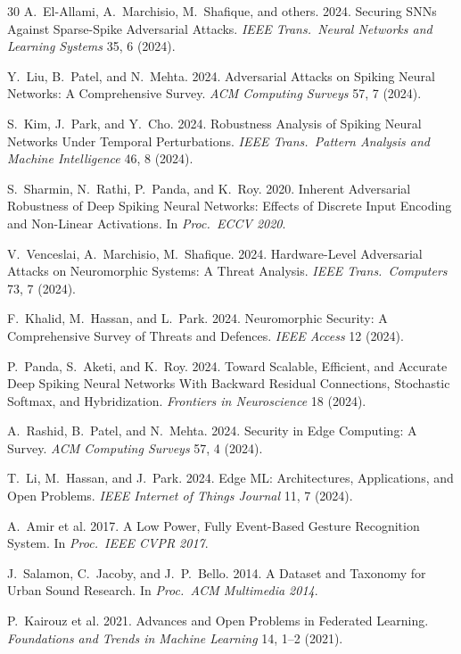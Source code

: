 \documentclass[sigconf,nonacm]{acmart}
\begin{document}
\begin{thebibliography}{30}
A.~El-Allami, A.~Marchisio, M.~Shafique, and others. 2024.
Securing SNNs Against Sparse-Spike Adversarial Attacks.
\textit{IEEE Trans.\ Neural Networks and Learning Systems}
35, 6 (2024).

Y.~Liu, B.~Patel, and N.~Mehta. 2024. Adversarial Attacks on
Spiking Neural Networks: A Comprehensive Survey.
\textit{ACM Computing Surveys} 57, 7 (2024).

S.~Kim, J.~Park, and Y.~Cho. 2024. Robustness Analysis of
Spiking Neural Networks Under Temporal Perturbations.
\textit{IEEE Trans.\ Pattern Analysis and Machine Intelligence}
46, 8 (2024).

S.~Sharmin, N.~Rathi, P.~Panda, and K.~Roy. 2020. Inherent
Adversarial Robustness of Deep Spiking Neural Networks: Effects
of Discrete Input Encoding and Non-Linear Activations.
In \textit{Proc.\ ECCV 2020}.

V.~Venceslai, A.~Marchisio, M.~Shafique. 2024. Hardware-Level
Adversarial Attacks on Neuromorphic Systems: A Threat Analysis.
\textit{IEEE Trans.\ Computers} 73, 7 (2024).

F.~Khalid, M.~Hassan, and L.~Park. 2024. Neuromorphic Security:
A Comprehensive Survey of Threats and Defences.
\textit{IEEE Access} 12 (2024).

P.~Panda, S.~Aketi, and K.~Roy. 2024. Toward Scalable, Efficient,
and Accurate Deep Spiking Neural Networks With Backward Residual
Connections, Stochastic Softmax, and Hybridization.
\textit{Frontiers in Neuroscience} 18 (2024).

A.~Rashid, B.~Patel, and N.~Mehta. 2024. Security in Edge
Computing: A Survey. \textit{ACM Computing Surveys} 57, 4 (2024).

T.~Li, M.~Hassan, and J.~Park. 2024. Edge ML: Architectures,
Applications, and Open Problems.
\textit{IEEE Internet of Things Journal} 11, 7 (2024).

A.~Amir et al. 2017. A Low Power, Fully Event-Based Gesture
Recognition System. In \textit{Proc.\ IEEE CVPR 2017}.

J.~Salamon, C.~Jacoby, and J.~P.~Bello. 2014. A Dataset and
Taxonomy for Urban Sound Research. In \textit{Proc.\ ACM
Multimedia 2014}.

P.~Kairouz et al. 2021. Advances and Open Problems in Federated
Learning. \textit{Foundations and Trends in Machine Learning} 14,
1--2 (2021).


\end{thebibliography}
\end{document}
